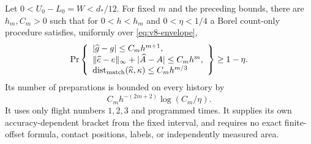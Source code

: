 \begin{theorem}
\label{thm:v8-nuisance}
Let $0<U_0-L_0=W<d_*/12$. For fixed $m$ and the preceding bounds,
there are $h_m,C_m>0$ such that for $0<h<h_m$ and $0<\eta<1/4$
a Borel count-only procedure satisfies, uniformly over
\eqref{eq:v8-envelope},
\begin{equation}\label{eq:v8-nuisance-errors}
 \Pr\left\{
 \begin{array}{l}
 |\widehat g-g|\le C_mh^{m+1},\\
 \|\widehat e-e\|_\infty+|\widehat A-A|\le C_mh^m,\\
 \operatorname{dist}_{\rm match}(\widehat\kappa,\kappa)
                                      \le C_mh^{m/3}
 \end{array}\right\}\ge1-\eta.
\end{equation}
Its number of preparations is bounded on every history by
\begin{equation}\label{eq:v8-nuisance-cost}
                       C_mh^{-(2m+2)}\log(C_m/\eta).
\end{equation}
It uses only flight numbers $1,2,3$ and programmed times. It supplies
its own accuracy-dependent bracket from the fixed interval, and
requires no exact finite-offset formula, contact positions, labels,
or independently measured area.
\end{theorem}
